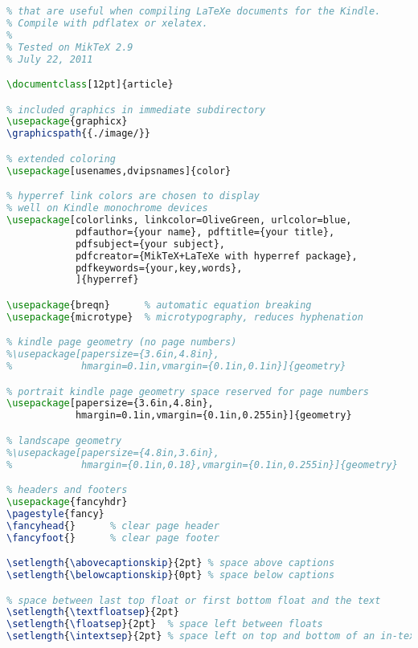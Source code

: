 \begin{tcolorbox}[breakable, size=fbox, boxrule=1pt, pad at break*=1mm,colback=cellbackground, colframe=cellborder]
\lstset{style=smallersource}
\begin{lstlisting}[language=TeX,frame=single,framerule=0pt,label=lst:scr1543X0]
% A simple test document that displays some packages and settings
% that are useful when compiling LaTeXe documents for the Kindle.
% Compile with pdflatex or xelatex.
%
% Tested on MikTeX 2.9
% July 22, 2011

\documentclass[12pt]{article}

% included graphics in immediate subdirectory
\usepackage{graphicx}
\graphicspath{{./image/}}

% extended coloring
\usepackage[usenames,dvipsnames]{color}

% hyperref link colors are chosen to display
% well on Kindle monochrome devices
\usepackage[colorlinks, linkcolor=OliveGreen, urlcolor=blue,
            pdfauthor={your name}, pdftitle={your title},
            pdfsubject={your subject},
            pdfcreator={MikTeX+LaTeXe with hyperref package},
            pdfkeywords={your,key,words},
            ]{hyperref}

\usepackage{breqn}      % automatic equation breaking
\usepackage{microtype}  % microtypography, reduces hyphenation

% kindle page geometry (no page numbers)
%\usepackage[papersize={3.6in,4.8in},
%            hmargin=0.1in,vmargin={0.1in,0.1in}]{geometry}

% portrait kindle page geometry space reserved for page numbers
\usepackage[papersize={3.6in,4.8in},
            hmargin=0.1in,vmargin={0.1in,0.255in}]{geometry}

% landscape geometry
%\usepackage[papersize={4.8in,3.6in},
%            hmargin={0.1in,0.18},vmargin={0.1in,0.255in}]{geometry}

% headers and footers
\usepackage{fancyhdr}
\pagestyle{fancy}
\fancyhead{}      % clear page header
\fancyfoot{}      % clear page footer

\setlength{\abovecaptionskip}{2pt} % space above captions
\setlength{\belowcaptionskip}{0pt} % space below captions

% space between last top float or first bottom float and the text
\setlength{\textfloatsep}{2pt} 
\setlength{\floatsep}{2pt}  % space left between floats
\setlength{\intextsep}{2pt} % space left on top and bottom of an in-text float


\end{lstlisting}
\end{tcolorbox}

